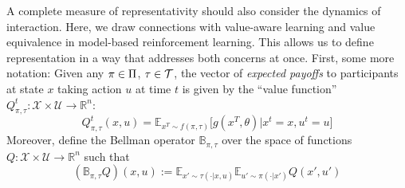 A complete measure of representativity should also consider the dynamics of interaction.
%
Here, we draw connections with value-aware learning \cite{farahmand2017value,farahmand2018iterative} and value equivalence \cite{grimm2020value,grimm2021proper,grimm2022approximate,arumugam2022deciding} in model-based reinforcement learning. This allows us to define representation in a way that addresses both concerns at once.
%
First, some more notation:
%
Given any $\pi\in\Pi$, $\tau\in\mathcal{T}$,
the vector of \textit{expected payoffs} to participants at state $x$ taking action $u$ at time $t$ is given by the ``value function''
%
$Q_{\pi,\tau}^{t}:\mathcal{X}\times\mathcal{U}\rightarrow\mathbb{R}^{n}$:
%
%
%
\begin{equation}
Q_{\pi,\tau}^{t}(x,u)
=
\mathbb{E}_{x^{T}\sim f(\pi,\tau)}\big[g(x^{T},\theta)|x^{t}=x,u^{t}=u\big]
\end{equation}
%
Moreover, define the Bellman operator $\mathbb{B}_{\pi,\tau}$ over the space of functions
$Q:\mathcal{X}\times\mathcal{U}\rightarrow\mathbb{R}^{n}$ such that
%
\begin{equation}
(\mathbb{B}_{\pi,\tau}Q)(x,u)
:=
\mathbb{E}_{x'\sim\tau(\cdot|x,u)}
\mathbb{E}_{u'\sim\pi(\cdot|x')}
Q(x',u')
\label{eqn:bellman}
\end{equation}
%

